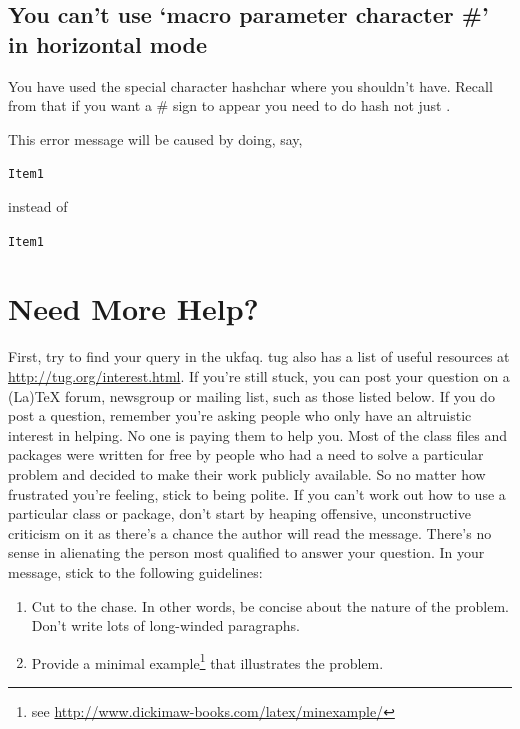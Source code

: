 
\section{You can't use `macro parameter character \#' in horizontal mode}

You have used the special character \gls{hashchar} where you shouldn't
have.  Recall from  that if you want a \# sign to appear you need
to do \gls{hash} not just .

This error message will be caused by doing, say,
\begin{alltt}\wrong
Item 1
\end{alltt}
instead of
\begin{alltt}\correct
Item 1
\end{alltt}

\chapter{Need More Help?}
\label{ch:help}

First, try to find your query in the \gls{ukfaq}. \Gls{tug}
also has a list of useful resources at
\url{http://tug.org/interest.html}. If you're still stuck, you can
post your question on a (La)TeX forum, newsgroup or mailing list,
such as those listed below. If you do post a question, remember
you're asking people who only have an altruistic interest in
helping. No one is paying them to help you. Most of the class files
and packages were written for free by people who had a need to solve
a particular problem and decided to make their work publicly
available. So no matter how frustrated you're feeling, stick to
being polite. If you can't work out how to use a particular class or
package, don't start by heaping offensive, unconstructive criticism on it as there's a chance
the author will read the message. There's no sense in alienating the
person most qualified to answer your question. In your message,
stick to the following guidelines:
\begin{enumerate}
\item Cut to the chase. In other words, be concise about the nature
of the problem. Don't write lots of long-winded paragraphs.

\item Provide a minimal
example\footnote{see \url{http://www.dickimaw-books.com/latex/minexample/}} that 
illustrates the problem.

\end{enumerate}

